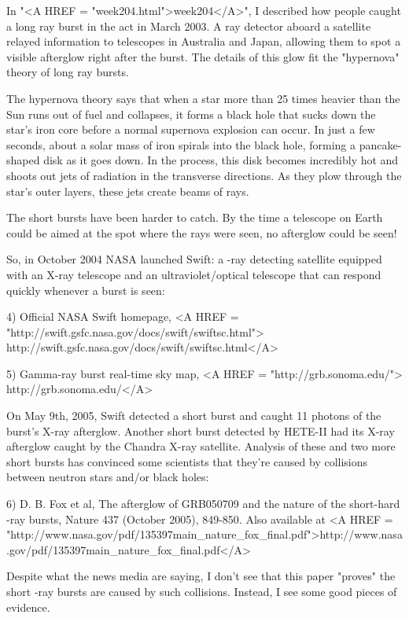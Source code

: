In "<A HREF = "week204.html">week204</A>", I described how 
people caught a long \gamma  ray burst 
in the act in March 2003.  A \gamma  ray detector aboard a satellite 
relayed information to telescopes in Australia and Japan, allowing 
them to spot a visible afterglow right after the burst.  The details 
of this glow fit the "hypernova" theory of long \gamma  ray bursts.

The hypernova theory says that when a star more than 25 times heavier
than the Sun runs out of fuel and collapses, it forms a black hole 
that sucks down the star's iron core before a normal supernova 
explosion can occur.  In just a few seconds, about a solar mass of 
iron spirals into the black hole, forming a pancake-shaped disk as 
it goes down.  In the process, this disk becomes incredibly hot and 
shoots out jets of radiation in the transverse directions.  As they 
plow through the star's outer layers, these jets create beams of 
\gamma  rays.  

The short bursts have been harder to catch.  By the time a telescope 
on Earth could be aimed at the spot where the \gamma  rays were seen, 
no afterglow could be seen!

So, in October 2004 NASA launched Swift: a \gamma -ray detecting 
satellite equipped with an X-ray telescope and an ultraviolet/optical 
telescope that can respond quickly whenever a burst is
seen:  

4) Official NASA Swift homepage,
<A HREF = "http://swift.gsfc.nasa.gov/docs/swift/swiftsc.html">
http://swift.gsfc.nasa.gov/docs/swift/swiftsc.html</A>

5) Gamma-ray burst real-time sky map, <A HREF = "http://grb.sonoma.edu/">
http://grb.sonoma.edu/</A>

On May 9th, 2005, Swift detected a short burst and caught 11 photons 
of the burst's X-ray afterglow.  Another short burst detected by 
HETE-II had its X-ray afterglow caught by the Chandra X-ray satellite.  
Analysis of these and two more short bursts has convinced some 
scientists that they're caused by collisions between neutron stars 
and/or black holes:

6) D. B. Fox et al, The afterglow of GRB050709 and the nature of the
short-hard \gamma -ray bursts, Nature 437 (October 2005), 849-850.
Also available at <A HREF = "http://www.nasa.gov/pdf/135397main_nature_fox_final.pdf">http://www.nasa.gov/pdf/135397main_nature_fox_final.pdf</A>

Despite what the news media are saying, I don't see that this paper 
"proves" the short \gamma -ray bursts are caused by such collisions.  
Instead, I see some good pieces of evidence.  

